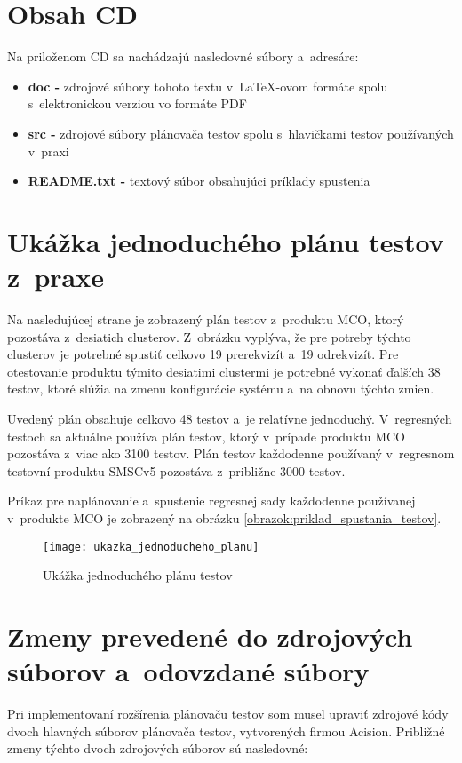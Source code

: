 %
%
\chapter{Obsah CD}
Na priloženom CD sa nachádzajú nasledovné súbory a~adresáre:
\begin{itemize}
\item \textbf{doc -} zdrojové súbory tohoto textu v~\LaTeX-ovom formáte 
spolu s~elektronickou verziou vo formáte PDF
\item \textbf{src -} zdrojové súbory plánovača testov spolu s~hlavičkami 
testov používaných v~praxi
\item \textbf{README.txt -} textový súbor obsahujúci príklady spustenia
\end{itemize}


%
%
\chapter{Ukážka jednoduchého plánu testov z~praxe}
\label{priloha:jednoduchy_plan_testov}
Na nasledujúcej strane je zobrazený plán testov z~produktu MCO,
ktorý pozostáva z~desiatich clusterov. Z~obrázku vyplýva, že pre potreby
týchto clusterov je potrebné spustiť celkovo 19 prerekvizít a~19 
odrekvizít. Pre otestovanie produktu týmito desiatimi clustermi je 
potrebné vykonať ďalších 38 testov, ktoré slúžia na zmenu konfigurácie
systému a~na obnovu týchto zmien. 

Uvedený plán obsahuje celkovo 48 testov a~je relatívne jednoduchý.
V~regresných testoch sa aktuálne používa plán testov, ktorý v~prípade 
produktu MCO pozostáva z~viac ako 3100 testov.
Plán testov každodenne používaný v~regresnom testovní produktu SMSCv5 
pozostáva z~približne 3000 testov.

Príkaz pre naplánovanie a~spustenie regresnej sady každodenne 
používanej v~produkte MCO je zobrazený na obrázku 
\ref{obrazok:priklad_spustania_testov}.


\begin{figure}[h]
  \texttt{[image: ukazka\_jednoducheho\_planu]}
  \caption{Ukážka jednoduchého plánu testov}
\end{figure}



%
%
\chapter{Zmeny prevedené do zdrojových súborov a~odovzdané súbory}
\label{priloha:zmeny_do_zdrojakov}
Pri implementovaní rozšírenia plánovaču testov som musel upraviť zdrojové
kódy dvoch hlavných súborov plánovača testov, vytvorených firmou Acision.
Približné zmeny týchto dvoch zdrojových súborov sú nasledovné:

